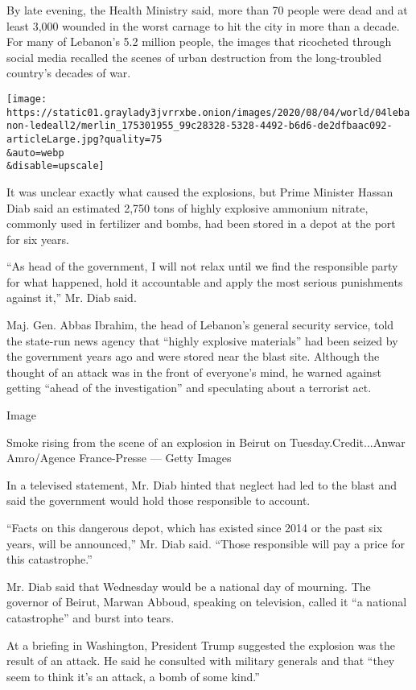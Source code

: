 By late evening, the Health Ministry said, more than 70 people were dead
and at least 3,000 wounded in the worst carnage to hit the city in more
than a decade. For many of Lebanon's 5.2 million people, the images that
ricocheted through social media recalled the scenes of urban destruction
from the long-troubled country's decades of war.

\texttt{[image: https://static01.graylady3jvrrxbe.onion/images/2020/08/04/world/04lebanon-ledeall2/merlin\_175301955\_99c28328-5328-4492-b6d6-de2dfbaac092-articleLarge.jpg?quality=75\\\&auto=webp\\\&disable=upscale]}

It was unclear exactly what caused the explosions, but Prime Minister
Hassan Diab said an estimated 2,750 tons of highly explosive ammonium
nitrate, commonly used in fertilizer and bombs, had been stored in a
depot at the port for six years.

``As head of the government, I will not relax until we find the
responsible party for what happened, hold it accountable and apply the
most serious punishments against it,'' Mr. Diab said.

Maj. Gen. Abbas Ibrahim, the head of Lebanon's general security service,
told the state-run news agency that ``highly explosive materials'' had
been seized by the government years ago and were stored near the blast
site. Although the thought of an attack was in the front of everyone's
mind, he warned against getting ``ahead of the investigation'' and
speculating about a terrorist act.

Image

Smoke rising from the scene of an explosion in Beirut on
Tuesday.Credit...Anwar Amro/Agence France-Presse --- Getty Images

In a televised statement, Mr. Diab hinted that neglect had led to the
blast and said the government would hold those responsible to account.

``Facts on this dangerous depot, which has existed since 2014 or the
past six years, will be announced,'' Mr. Diab said. ``Those responsible
will pay a price for this catastrophe.''

Mr. Diab said that Wednesday would be a national day of mourning. The
governor of Beirut, Marwan Abboud, speaking on television, called it ``a
national catastrophe'' and burst into tears.

At a briefing in Washington, President Trump suggested the explosion was
the result of an attack. He said he consulted with military generals and
that ``they seem to think it's an attack, a bomb of some kind.''

